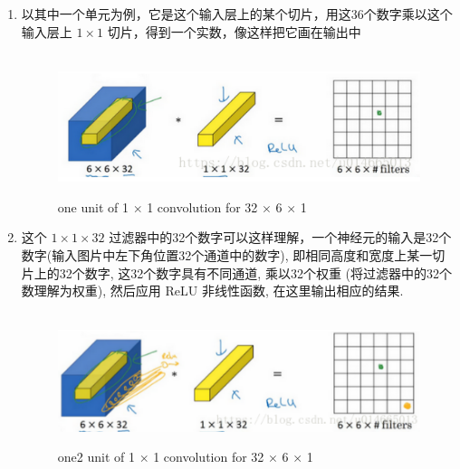\documentclass[12pt]{ctexart}%
\begin{document}
\begin{enumerate}
				\item 以其中一个单元为例，它是这个输入层上的某个切片，用这36个数字乘以这个输入层上 $1 \times 1$ 切片，得到一个实数，像这样把它画在输出中
						\begin{figure}[H]
							\vspace{-0.2cm}  %
							\setlength{\abovecaptionskip}{-0.2cm}   %
							\centering
							\includegraphics[scale=0.6]{2_for_6_6_32.png}
							\renewcommand{\figurename}{Fig} %
							\caption{one unit of 1 $\times$ 1 convolution for 32 $\times$ 6 $\times$ 1}
							\label{fig10: one unit for 6 6 32}
						\end{figure}
					
				\item 这个 $1 \times 1 \times 32$ 过滤器中的32个数字可以这样理解，一个神经元的输入是32个数字(输入图片中左下角位置32个通道中的数字), 即相同高度和宽度上某一切片上的32个数字, 这32个数字具有不同通道, 乘以32个权重 (将过滤器中的32个数理解为权重),  然后应用 ReLU 非线性函数, 在这里输出相应的结果.
						\begin{figure}[H]
							\vspace{-0.2cm}  %
							\setlength{\abovecaptionskip}{-0.2cm}   %
							\centering
							\includegraphics[scale=0.5]{3_for_6_6_32.png}
							\renewcommand{\figurename}{Fig} %
							\caption{one2 unit of 1 $\times$ 1 convolution for 32 $\times$ 6 $\times$ 1}
							\label{fig11: one unit for 6 6 32}
						\end{figure}
					

\end{enumerate}
\end{document}
